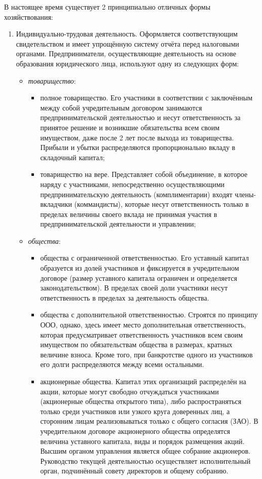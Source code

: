 \documentclass[12pt, russian, oneside, article]{ncc}
\begin{document}
В настоящее время существует 2 принципиально отличных формы хозяйствования:
\begin{enumerate}
\item Индивидуально-трудовая деятельность. Оформляется соответствующим свидетельством и имеет упрощённую систему отчёта перед налоговыми органами. Предприниматели, осуществляющие деятельность на основе образования юридического лица, используют одну из следующих форм:

\begin{itemize}
\item \emph{товарищество}:

\begin{itemize}
\item полное товарищество. Его участники в соответствии с заключённым между собой учредительным договором занимаются предпринимательской деятельностью и несут ответственность за принятое решение и возникшие обязательства всем своим имуществом, даже после 2 лет после выхода из товарищества. Прибыли и убытки распределяются пропорционально вкладу в складочный капитал;
\item товарищество на вере. Представляет собой объединение, в которое наряду с участниками, непосредственно осуществляющими предпринимательскую деятельность (комплиментарии) входят члены-вкладчики (коммандисты), которые несут ответственность только в пределах величины своего вклада не принимая участия в предпринимательской деятельности и управлении;
\end{itemize}

\item \emph{общества}:

\begin{itemize}
\item общества с ограниченной ответственностью. Его уставный капитал образуется из долей участников и фиксируется в учредительном договоре (размер уставного капитала ограничен и определяется законодательством). В пределах своей доли участники несут ответственность в пределах за деятельность общества.
\item общества с дополнительной ответственностью. Строятся по принципу ООО, однако, здесь имеет место дополнительная ответственность, которая предусматривает ответственность участников всем своим имуществом по обязательствам общества в размерах, кратных величине взноса. Кроме того, при банкротстве одного из участников его долги распределяются между всеми остальными.
\item акционерные общества. Капитал этих организаций распределён на акции, которые могут свободно отчуждаться участниками (акционерные общества открытого типа), либо распространяться только среди участников или узкого круга доверенных лиц, а сторонним лицам реализовываться только с общего согласия (ЗАО). В учредительном договоре акционерного общества определятся величина уставного капитала, виды и порядок размещения акций. Высшим органом управления является общее собрание акционеров. Руководство текущей деятельностью осуществляет исполнительный орган, подчинённый совету директоров и общему собранию.
\end{itemize}


\end{itemize}
\end{enumerate}
\end{document}
